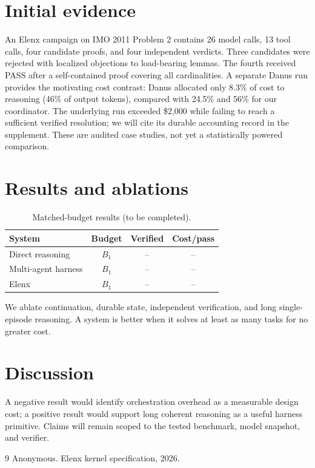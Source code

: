 \documentclass{article}
\begin{document}
\section{Initial evidence}An Elenx campaign on IMO 2011 Problem 2 contains 26 model calls, 13 tool calls, four candidate proofs, and four independent verdicts. Three candidates were rejected with localized objections to load-bearing lemmas. The fourth received PASS after a self-contained proof covering all cardinalities. A separate Danus run provides the motivating cost contrast: Danus allocated only 8.3\% of cost to reasoning (46\% of output tokens), compared with 24.5\% and 56\% for our coordinator. The underlying run exceeded \$2,000 while failing to reach a sufficient verified resolution; we will cite its durable accounting record in the supplement. These are audited case studies, not yet a statistically powered comparison.
\section{Results and ablations}\begin{table}[h]\centering\caption{Matched-budget results (to be completed).}\begin{tabular}{lccc}\toprule System & Budget & Verified & Cost/pass\\\midrule Direct reasoning & $B_1$ & -- & --\\ Multi-agent harness & $B_1$ & -- & --\\ Elenx & $B_1$ & -- & --\\\bottomrule\end{tabular}\end{table}We ablate continuation, durable state, independent verification, and long single-episode reasoning. A system is better when it solves at least as many tasks for no greater cost.\section{Discussion}A negative result would identify orchestration overhead as a measurable design cost; a positive result would support long coherent reasoning as a useful harness primitive. Claims will remain scoped to the tested benchmark, model snapshot, and verifier.\begin{thebibliography}{9} Anonymous. Elenx kernel specification, 2026.\end{thebibliography}
\end{document}
